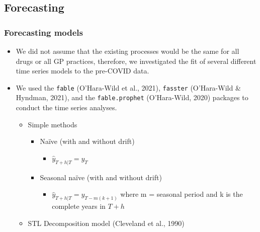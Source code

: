 \clearpage
\makeatletter
\efloat@restorefloats
\makeatother


\begin{appendix}
\renewcommand{\appendixname}{Supplementary Material}
\renewcommand{\thefigure}{SI\arabic{figure}} \setcounter{figure}{0}
\renewcommand{\thetable}{SI\arabic{table}} \setcounter{table}{0}
\renewcommand{\theequation}{SI\arabic{table}} \setcounter{equation}{0}

\hypertarget{forecasting}{%
\section{Forecasting}\label{forecasting}}

\hypertarget{forecasting-models}{%
\subsubsection{Forecasting models}\label{forecasting-models}}

\begin{itemize}
\tightlist
\item
  We did not assume that the existing processes would be the same for
  all drugs or all GP practices, therefore, we investigated the fit of
  several different time series models to the pre-COVID data.
\item
  We used the \texttt{fable} (O'Hara-Wild et al., 2021),
  \texttt{fasster} (O'Hara-Wild \& Hyndman, 2021), and the
  \texttt{fable.prophet} (O'Hara-Wild, 2020) packages to conduct the
  time series analyses.

  \begin{itemize}
  \tightlist
  \item
    Simple methods

    \begin{itemize}
    \tightlist
    \item
      Naïve (with and without drift)

      \begin{itemize}
      \tightlist
      \item
        \(\hat{y}_{T+h|T} = y_T\)
      \end{itemize}
    \item
      Seasonal naïve (with and without drift)

      \begin{itemize}
      \tightlist
      \item
        \(\hat{y}_{T+h|T} = y_{T-m(k+1)}\) where m = seasonal period and
        k is the complete years in \(T+h\)
      \end{itemize}
    \end{itemize}
  \item
    STL Decomposition model (Cleveland et al., 1990)


\end{itemize}
\end{itemize}
\end{appendix}
